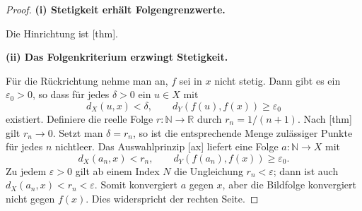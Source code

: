 \documentclass[main.tex]{subfiles}
\begin{document}
\begin{proof}
\par\medskip\noindent\textbf{(i) Stetigkeit erhält Folgengrenzwerte.}\par
Die Hinrichtung ist
[thm].

\par\medskip\noindent\textbf{(ii) Das Folgenkriterium erzwingt Stetigkeit.}\par
Für die Rückrichtung nehme man an, \(f\) sei in \(x\) nicht stetig. Dann
gibt es ein \(\varepsilon_0>0\), so dass für jedes \(\delta>0\) ein
\(u\in X\) mit
\[
 d_X(u,x)<\delta,
 \qquad
 d_Y(f(u),f(x))\geq\varepsilon_0
\]
existiert. Definiere die reelle Folge \(r\colon\mathbb N\to\mathbb R\) durch
\(r_n=1/(n+1)\). Nach
[thm] gilt
\(r_n\to0\). Setzt man \(\delta=r_n\), so ist die entsprechende Menge
zulässiger Punkte für jedes \(n\) nichtleer. Das Auswahlprinzip
[ax] liefert eine Folge \(a\colon\mathbb N\to X\)
mit
\[
 d_X(a_n,x)<r_n,
 \qquad
 d_Y(f(a_n),f(x))\geq\varepsilon_0.
\]
Zu jedem \(\varepsilon>0\) gilt ab einem Index \(N\) die Ungleichung
\(r_n<\varepsilon\); dann ist auch
\(d_X(a_n,x)<r_n<\varepsilon\). Somit konvergiert \(a\) gegen \(x\), aber die
Bildfolge konvergiert nicht gegen \(f(x)\). Dies widerspricht der rechten
Seite.
\end{proof}
\end{document}
